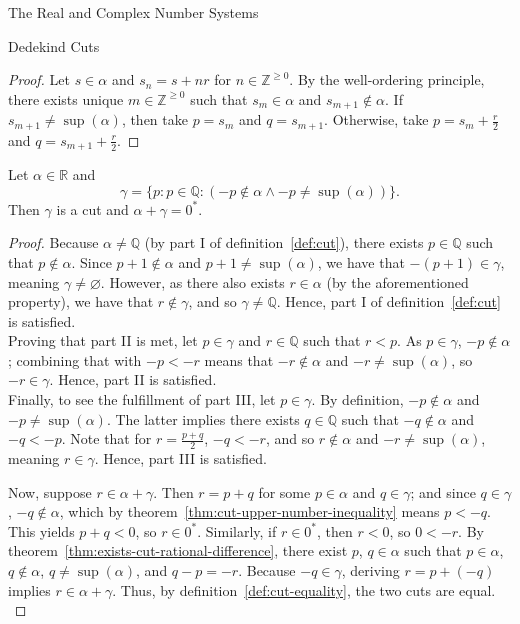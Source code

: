 \begin{chapter}{The Real and Complex Number Systems}
\begin{section}{Dedekind Cuts}
	\begin{proof}
		Let $s \in \alpha$ and $s_n = s + n r$ for $n \in \mathbb{Z}^{\geq
		0}$. By the well-ordering principle, there exists unique $m \in \mathbb{Z}
		^{\geq 0}$ such that $s_m \in \alpha$ and $s_{m + 1} \nin \alpha$. If
		$s_{m + 1} \neq \sup(\alpha)$, then take $p = s_m$ and $q = s_{m +
		1}$. Otherwise, take $p = s_m + \frac{r}{2}$ and $q = s_{m + 1} +
		\frac{r}{2}$.
	\end{proof}

	\begin{theorem}
		\label{thm:cut-additive-inverse-exists}
		Let $\alpha \in \mathbb{R}$ and
		\[ \gamma = \{p : p \in \mathbb{Q} : (-p \nin \alpha \land -p \neq
			\sup(\alpha))\}. \] 
		Then $\gamma$ is a cut and $\alpha + \gamma = 0^*$.
	\end{theorem}

	\begin{proof}
		Because $\alpha \neq \mathbb{Q}$ (by part I of definition~\ref{def:cut}),
		there exists $p \in \mathbb{Q}$ such that $p \nin \alpha$. Since $p +
		1 \nin \alpha$ and $p + 1 \neq \sup(\alpha)$, we have that $-(p + 1)
		\in \gamma$, meaning $\gamma \neq \varnothing$. However, as there also
		exists $r \in \alpha$ (by the aforementioned property), we have that $r
		\nin \gamma$, and so $\gamma \neq \mathbb{Q}$. Hence, part I of
		definition~\ref{def:cut} is satisfied. \\

		Proving that part II is met, let $p \in \gamma$ and $r \in \mathbb{Q}$
		such that $r < p$. As $p \in \gamma$, $-p \nin \alpha$; combining
		that with $-p < -r$ means that $-r \nin \alpha$ and $-r \neq
		\sup(\alpha)$, so $-r \in \gamma$. Hence, part II is satisfied. \\

		Finally, to see the fulfillment of part III, let $p \in \gamma$. By
		definition, $-p \nin \alpha$ and $-p \neq \sup(\alpha)$. The latter
		implies there exists $q \in \mathbb{Q}$ such that $-q \nin \alpha$ and
		$-q < -p$. Note that for $r = \frac{p + q}{2}$, $-q < -r$, and so $
		r \nin \alpha$ and $-r \neq \sup(\alpha)$, meaning $r \in \gamma$.
		Hence, part III is satisfied. \\

		\newpage

		Now, suppose $r \in \alpha + \gamma$. Then $r = p + q$ for some $p \in 
		\alpha$ and $q \in \gamma$; and since $q \in \gamma$, $-q \nin
		\alpha$, which by theorem~\ref{thm:cut-upper-number-inequality} means $p
		< -q$. This yields $p + q < 0$, so $r \in 0^*$. Similarly, if $r \in
		0^*$, then $r < 0$, so $0 < -r$. By
		theorem~\ref{thm:exists-cut-rational-difference}, there exist $p$, $q \in
		\alpha$ such that $p \in \alpha$, $q \nin \alpha$, $q \neq
		\sup(\alpha)$, and $q - p = -r$.
		Because $-q \in \gamma$, deriving $r = p + (-q)$ implies $r \in \alpha
		+ \gamma$. Thus, by definition~\ref{def:cut-equality}, the two cuts are
		equal. \\


\end{proof}
\end{section}
\end{chapter}

